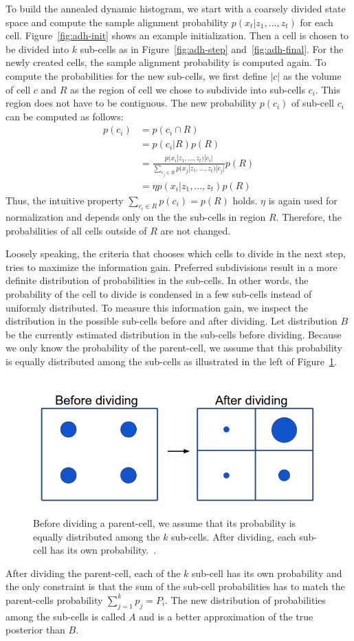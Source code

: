 \documentclass[twoside,a4paper,article]{combine}
\begin{document}
To build the annealed dynamic histogram, we start with a coarsely
divided state space and compute the sample alignment probability
$p(x_t|z_1,...,z_t)$ for each cell. Figure~\ref{fig:adh-init} shows an
example initialization. Then a cell is chosen to be divided into $k$
sub-cells as in Figure~\ref{fig:adh-step} and~\ref{fig:adh-final}. For
the newly created cells, the sample alignment probability is computed
again. To compute the probabilities for the new sub-cells, we first
define $|c|$ as the volume of cell $c$ and $R$ as the region of cell
we chose to subdivide into sub-cells $c_i$. This region does not have
to be contiguous. The new probability $p(c_i)$ of sub-cell $c_i$ can be
computed as follows:
\begin{align}
p(c_i)
&=p(c_i\cap R)\nonumber\\
&=p(c_i|R)p(R)\nonumber\\
&=\frac{p(x_i|z_1,...,z_t)|c_i|}{\sum_{c_j\in
    R}p(x_j|z_1,...,z_t)|c_{j}|}p(R)\nonumber\\
&=\eta p(x_i|z_1,...,z_t)p(R)
\end{align}
Thus, the intuitive property $\sum_{c_i\in R}p(c_i)=p(R)$
holds. $\eta$ is again used for normalization and depends only on the
the sub-cells in region $R$. Therefore, the probabilities of all cells
outside of $R$ are not changed.

Loosely speaking, the criteria that chooses which cells to divide in
the next step, tries to maximize the information gain. Preferred
subdivisions result in a more definite distribution of probabilities
in the sub-cells. In other words, the probability of the cell to divide
is condensed in a few sub-cells instead of uniformly distributed. 
To measure this information gain, we inspect the distribution in the
possible sub-cells before and after dividing. Let distribution $B$ be the
currently estimated distribution in the sub-cells before
dividing. Because we only know the probability of the parent-cell, we
assume that this probability is equally distributed among the sub-cells
as illustrated in the left of Figure~\ref{fig:adh-criteria}.
\begin{figure}
  \center
  \includegraphics[width=0.55\linewidth]{devision-criteria}
  \caption{Before dividing a parent-cell, we assume that its
    probability is equally distributed among the $k$ sub-cells. After
    dividing, each sub-cell has its own probability.~\cite{paper}.}
  \label{fig:adh-criteria}
\end{figure}
After dividing the parent-cell, each of the $k$ sub-cell has its own
probability and the only constraint is that the sum of the sub-cell
probabilities has to match the parent-cells probability $\sum_{j=1}^k p_j=P_i$. The new
distribution of probabilities among the sub-cells is called $A$ and is
a better approximation of the true posterior than $B$.
\end{document}
